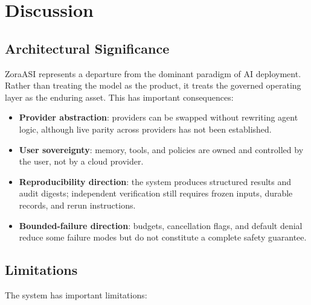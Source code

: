 \documentclass[11pt]{article}
\begin{document}
\section{Discussion}

\subsection{Architectural Significance}

ZoraASI represents a departure from the dominant paradigm of AI deployment. Rather than treating the model as the product, it treats the governed operating layer as the enduring asset. This has important consequences:

\begin{itemize}[leftmargin=*]
  \item \textbf{Provider abstraction}: providers can be swapped without rewriting agent logic, although live parity across providers has not been established.
  \item \textbf{User sovereignty}: memory, tools, and policies are owned and controlled by the user, not by a cloud provider.
  \item \textbf{Reproducibility direction}: the system produces structured results and audit digests; independent verification still requires frozen inputs, durable records, and rerun instructions.
  \item \textbf{Bounded-failure direction}: budgets, cancellation flags, and default denial reduce some failure modes but do not constitute a complete safety guarantee.
\end{itemize}

\subsection{Limitations}

The system has important limitations:
\end{document}
